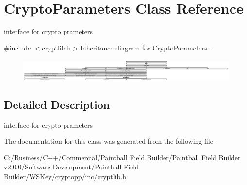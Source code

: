 \hypertarget{class_crypto_parameters}{
\section{CryptoParameters Class Reference}
\label{class_crypto_parameters}
}


interface for crypto prameters  


{\ttfamily \#include $<$cryptlib.h$>$}Inheritance diagram for CryptoParameters::\begin{figure}[H]
\begin{center}
\leavevmode
\includegraphics[height=1.17782cm]{class_crypto_parameters}
\end{center}
\end{figure}


\subsection{Detailed Description}
interface for crypto prameters 

The documentation for this class was generated from the following file:\begin{DoxyCompactItemize}
\item 
C:/Business/C++/Commercial/Paintball Field Builder/Paintball Field Builder v2.0.0/Software Development/Paintball Field Builder/WSKey/cryptopp/inc/\hyperlink{cryptlib_8h}{cryptlib.h}\end{DoxyCompactItemize}
